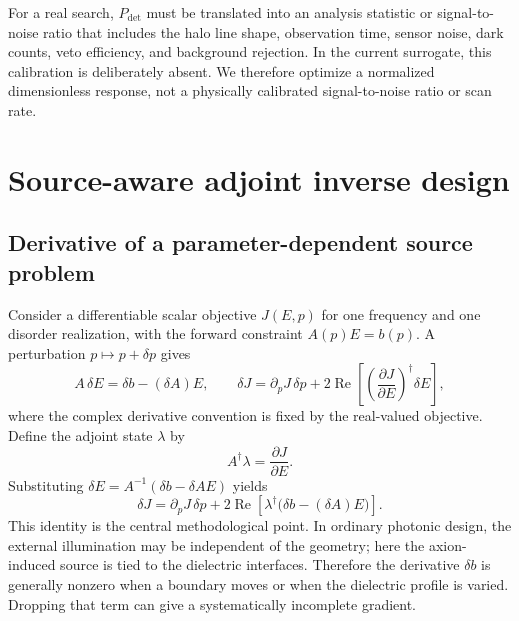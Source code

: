 \documentclass[10.5pt,a4paper]{article}
\newcommand{\Real}{\operatorname{Re}}
\begin{document}
For a real search, $P_{\mathrm{det}}$ must be translated into an analysis statistic or signal-to-noise ratio that includes the halo line shape, observation time, sensor noise, dark counts, veto efficiency, and background rejection. In the current surrogate, this calibration is deliberately absent. We therefore optimize a normalized dimensionless response, not a physically calibrated signal-to-noise ratio or scan rate.

\section{Source-aware adjoint inverse design}
\subsection{Derivative of a parameter-dependent source problem}
Consider a differentiable scalar objective $J(E,p)$ for one frequency and one disorder realization, with the forward constraint $A(p)E=b(p)$. A perturbation $p\mapsto p+\delta p$ gives
\begin{equation}
A\,\delta E = \delta b-(\delta A)E,
\qquad
\delta J = \partial_pJ\,\delta p + 2\Real\!\left[\left(\frac{\partial J}{\partial E}\right)^\dagger\delta E\right],
\label{eq:deltaj}
\end{equation}
where the complex derivative convention is fixed by the real-valued objective. Define the adjoint state $\lambda$ by
\begin{equation}
A^\dagger\lambda = \frac{\partial J}{\partial E}.
\label{eq:adjoint}
\end{equation}
Substituting $\delta E=A^{-1}(\delta b-\delta A E)$ yields
\begin{equation}
\boxed{\delta J=\partial_pJ\,\delta p+2\Real\!\left[\lambda^\dagger\bigl(\delta b-(\delta A)E\bigr)\right].}
\label{eq:adjointgradient}
\end{equation}
This identity is the central methodological point. In ordinary photonic design, the external illumination may be independent of the geometry; here the axion-induced source is tied to the dielectric interfaces. Therefore the derivative $\delta b$ is generally nonzero when a boundary moves or when the dielectric profile is varied. Dropping that term can give a systematically incomplete gradient.
\end{document}
